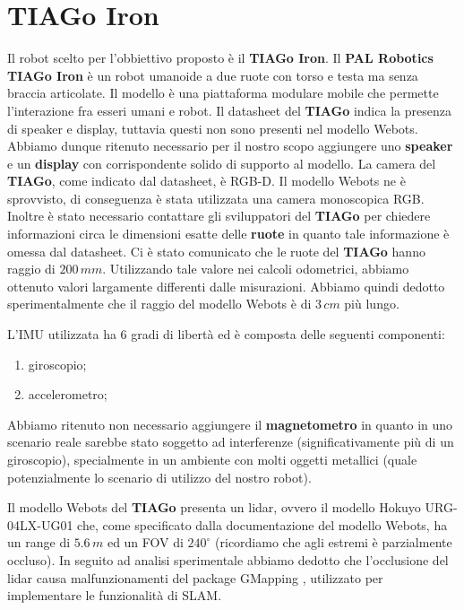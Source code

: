\documentclass[a4paper]{article}
\begin{document}
	\section{TIAGo Iron}\label{sec:TIAGo-Iron} 
	Il robot scelto per l'obbiettivo proposto è il \textbf{TIAGo Iron}. \newline Il \textbf{PAL Robotics TIAGo Iron} \cite{tiagoiron} è un robot umanoide a due ruote con torso e testa ma senza braccia articolate. Il modello è una piattaforma modulare mobile che permette l'interazione fra esseri umani e robot. \newline
	Il datasheet del \textbf{TIAGo} indica la presenza di speaker e display, tuttavia questi non sono presenti nel modello Webots. Abbiamo dunque ritenuto necessario per il nostro scopo aggiungere uno \textbf{speaker} e un \textbf{display} con corrispondente solido di supporto al modello.
	La camera del \textbf{TIAGo}, come indicato dal datasheet, è RGB-D. Il modello Webots ne è sprovvisto, di conseguenza è stata utilizzata una camera monoscopica RGB.
	Inoltre è stato necessario contattare gli sviluppatori del \textbf{TIAGo} per chiedere informazioni circa le dimensioni esatte delle \textbf{ruote} in quanto tale informazione è omessa dal datasheet. Ci è stato comunicato che le ruote del \textbf{TIAGo} hanno raggio di $200\,mm$. Utilizzando tale valore nei calcoli odometrici, abbiamo ottenuto valori largamente differenti dalle misurazioni. Abbiamo quindi dedotto sperimentalmente che il raggio del modello Webots è di $3\,cm$ più lungo. 
	
    L'IMU utilizzata ha 6 gradi di libertà ed è composta delle seguenti componenti:
	\begin{enumerate}
		\item giroscopio;	
		\item accelerometro;
	\end{enumerate}
	Abbiamo ritenuto non necessario aggiungere il \textbf{magnetometro} in quanto in uno scenario reale sarebbe stato soggetto ad interferenze (significativamente più di un giroscopio), specialmente in un ambiente con molti oggetti metallici (quale potenzialmente lo scenario di utilizzo del nostro robot).
	
	Il modello Webots del \textbf{TIAGo} presenta un lidar, ovvero il modello Hokuyo URG-04LX-UG01 \cite{lidarspecs} che, come specificato dalla documentazione del modello Webots,  ha un range di $5.6\,m$ ed un FOV di $240^{\circ}$ (ricordiamo che agli estremi è parzialmente occluso). In seguito ad analisi sperimentale abbiamo dedotto che l'occlusione del lidar causa malfunzionamenti del package GMapping \cite{grisettiyz2005improving}, utilizzato per implementare le funzionalità di SLAM.
\end{document}
